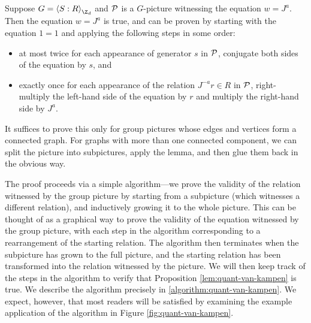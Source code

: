 \begin{prop}\label{lem:quant-van-kampen}
	Suppose $G = \Braket{S:R}_{\Z_d}$ and $\mathcal P$ is a $G$-picture witnessing the equation $w = J^a$.
	Then the equation $w = J^a$ is true, and can be proven by starting with the equation $1= 1$ and applying the following steps in some order:
	\begin{itemize}
		\item at most twice for each appearance of generator $s$ in $\mathcal P$, conjugate both sides of the equation by $s$, and
		\item exactly once for each appearance of the relation $J^{-a}r\in R$ in $\mathcal P$, right-multiply the left-hand side of the equation by $r$ and multiply the right-hand side by $J^a$.
	\end{itemize}
\end{prop}

It suffices to prove this only for group pictures whose edges and vertices form a connected graph. For graphs with more than one connected component, we can split the picture into subpictures, apply the lemma, and then glue them back in the obvious way.

The proof proceeds via a simple algorithm---we prove the validity of the relation witnessed by the group picture by starting from a subpicture (which witnesses a different relation), and inductively growing it to the whole picture. This can be thought of as a graphical way to prove the validity of the equation witnessed by the group picture, with each step in the algorithm corresponding to a rearrangement of the starting relation. The algorithm then terminates when the subpicture has grown to the full picture, and the starting relation has been transformed into the relation witnessed by the picture. We will then keep track of the steps in the algorithm to verify that Proposition \ref{lem:quant-van-kampen} is true. We describe the algorithm precisely in \ref{algorithm:quant-van-kampen}. We expect, however, that most readers will be satisfied by examining the example application of the algorithm in Figure \ref{fig:quant-van-kampen}.


